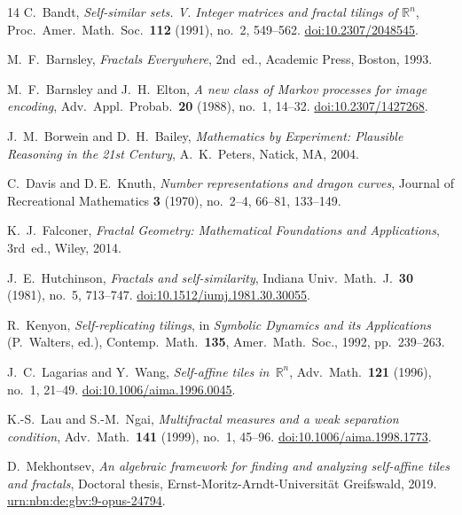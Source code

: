 \documentclass{amsart}
\theoremstyle{definition}
\theoremstyle{remark}
\begin{document}
\begin{thebibliography}{14}
C.~Bandt,
\textit{Self-similar sets. {V}. Integer matrices and fractal tilings of $\mathbb{R}^n$},
Proc.\ Amer.\ Math.\ Soc.\ \textbf{112} (1991), no.~2, 549--562.
\href{https://doi.org/10.2307/2048545}{doi:10.2307/2048545}.

M.~F.~Barnsley,
\textit{Fractals Everywhere},
2nd~ed., Academic Press, Boston, 1993.

M.~F.~Barnsley and J.~H.~Elton,
\textit{A new class of Markov processes for image encoding},
Adv.\ Appl.\ Probab.\ \textbf{20} (1988), no.~1, 14--32.
\href{https://doi.org/10.2307/1427268}{doi:10.2307/1427268}.

J.~M.~Borwein and D.~H.~Bailey,
\textit{Mathematics by Experiment: Plausible Reasoning in the 21st Century},
A.~K.~Peters, Natick, MA, 2004.

C.~Davis and D.\,E.~Knuth,
\textit{Number representations and dragon curves},
Journal of Recreational Mathematics \textbf{3} (1970), no.~2--4, 66--81, 133--149.

K.~J.~Falconer,
\textit{Fractal Geometry: Mathematical Foundations and Applications},
3rd~ed., Wiley, 2014.

J.~E.~Hutchinson,
\textit{Fractals and self-similarity},
Indiana Univ.\ Math.\ J.\ \textbf{30} (1981), no.~5, 713--747.
\href{https://doi.org/10.1512/iumj.1981.30.30055}{doi:10.1512/iumj.1981.30.30055}.

R.~Kenyon,
\textit{Self-replicating tilings},
in \textit{Symbolic Dynamics and its Applications} (P.~Walters, ed.),
Contemp.\ Math.\ \textbf{135}, Amer.\ Math.\ Soc., 1992, pp.~239--263.

J.~C.~Lagarias and Y.~Wang,
\textit{Self-affine tiles in~$\mathbb{R}^n$},
Adv.\ Math.\ \textbf{121} (1996), no.~1, 21--49.
\href{https://doi.org/10.1006/aima.1996.0045}{doi:10.1006/aima.1996.0045}.

K.-S.~Lau and S.-M.~Ngai,
\textit{Multifractal measures and a weak separation condition},
Adv.\ Math.\ \textbf{141} (1999), no.~1, 45--96.
\href{https://doi.org/10.1006/aima.1998.1773}{doi:10.1006/aima.1998.1773}.

D.~Mekhontsev,
\textit{An algebraic framework for finding and analyzing self-affine tiles and fractals},
Doctoral thesis, Ernst-Moritz-Arndt-Universit\"at Greifswald, 2019.
\href{https://nbn-resolving.org/urn:nbn:de:gbv:9-opus-24794}{urn:nbn:de:gbv:9-opus-24794}.


\end{thebibliography}
\end{document}
